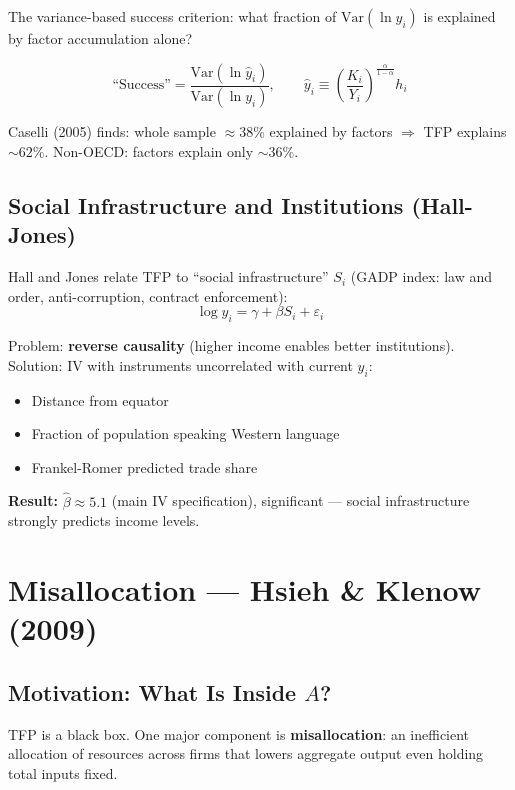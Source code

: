\documentclass[a4paper,11pt]{article}
\begin{document}
The variance-based success criterion: what fraction of $\mathrm{Var}(\ln y_i)$ is explained by factor accumulation alone?

\[
\text{``Success''} = \frac{\mathrm{Var}\!\left(\ln\hat{y}_i\right)}{\mathrm{Var}(\ln y_i)}, \qquad \hat{y}_i \equiv \left(\frac{K_i}{Y_i}\right)^{\frac{\alpha}{1-\alpha}} h_i
\]

Caselli (2005) finds: whole sample $\approx 38\%$ explained by factors $\Rightarrow$ TFP explains $\sim 62\%$. Non-OECD: factors explain only $\sim 36\%$.

\subsection*{Social Infrastructure and Institutions (Hall-Jones)}

Hall and Jones relate TFP to ``social infrastructure'' $S_i$ (GADP index: law and order, anti-corruption, contract enforcement):
\[
\log y_i = \gamma + \beta S_i + \varepsilon_i
\]

Problem: \textbf{reverse causality} (higher income enables better institutions). Solution: IV with instruments uncorrelated with current $y_i$:
\begin{itemize}[noitemsep]
    \item Distance from equator
    \item Fraction of population speaking Western language
    \item Frankel-Romer predicted trade share
\end{itemize}

\textbf{Result:} $\hat{\beta} \approx 5.1$ (main IV specification), significant --- social infrastructure strongly predicts income levels.

\clearpage

\section{Misallocation --- Hsieh \& Klenow (2009)}

\subsection*{Motivation: What Is Inside $A$?}

TFP is a black box. One major component is \textbf{misallocation}: an inefficient allocation of resources across firms that lowers aggregate output even holding total inputs fixed.
\end{document}
